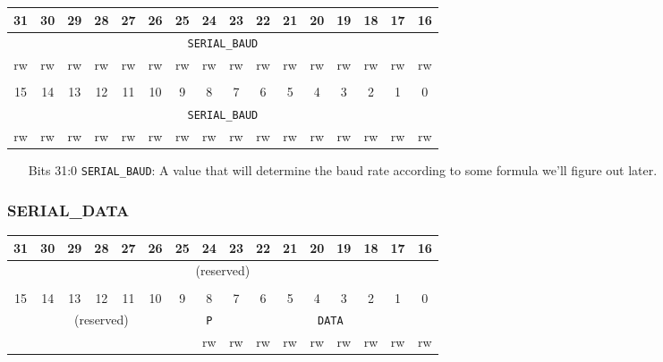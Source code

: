 \documentclass[11pt,openany]{report}
\begin{document}
\begin{center}
  \begin{tabular}{|c|c|c|c|c|c|c|c|c|c|c|c|c|c|c|c|}
    \hline
    31 & 30 & 29 & 28 & 27 & 26 & 25 & 24 & 23 & 22 & 21 & 20 & 19 & 18 & 17 & 16 \\
    \hline
    \multicolumn{16}{|c|}{\texttt{SERIAL\_BAUD}}\\
    \hline
    rw & rw & rw & rw & rw & rw & rw & rw & rw & rw & rw & rw & rw & rw & rw & rw\\
    \hline
    \multicolumn{16}{c}{}\\
    \hline
    15 & 14 & 13 & 12 & 11 & 10 & 9 & 8 & 7 & 6 & 5 & 4 & 3 & 2 & 1 & 0 \\
    \hline
    \multicolumn{16}{|c|}{\texttt{SERIAL\_BAUD}}\\
    \hline
    rw & rw & rw & rw & rw & rw & rw & rw & rw & rw & rw & rw & rw & rw & rw & rw\\
    \hline
  \end{tabular}
\end{center}

\begin{enumerate}
\item[Bits 31:0] \verb|SERIAL_BAUD|: A value that will determine the baud
rate according to some formula we'll figure out later.
\end{enumerate}

\subsubsection{SERIAL\_DATA}

\begin{center}
  \begin{tabular}{|c|c|c|c|c|c|c|c|c|c|c|c|c|c|c|c|}
    \hline
    31 & 30 & 29 & 28 & 27 & 26 & 25 & 24 & 23 & 22 & 21 & 20 & 19 & 18 & 17 & 16 \\
    \hline
    \multicolumn{16}{|c|}{\multirow{2}{*}{(reserved)}}\\
    \multicolumn{16}{|c|}{}\\
    \hline
    \multicolumn{16}{c}{}\\
    \hline
    15 & 14 & 13 & 12 & 11 & 10 & 9 & 8 & 7 & 6 & 5 & 4 & 3 & 2 & 1 & 0 \\
    \hline
    \multicolumn{7}{|c|}{\multirow{2}{*}{(reserved)}} & \texttt{P} & \multicolumn{8}{c|}{\texttt{DATA}}\\
    \cline{8-16}
    \multicolumn{7}{|c|}{} & rw & rw & rw & rw & rw & rw & rw & rw & rw\\
    \hline
  \end{tabular}
\end{center}
\end{document}
